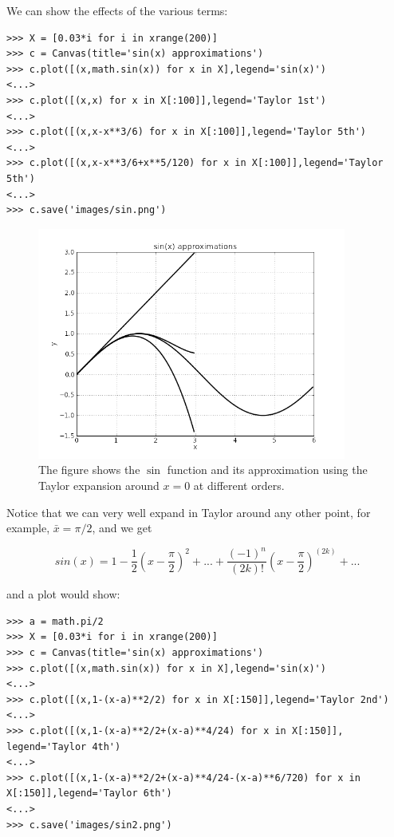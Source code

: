 \documentclass[justified,sixbynine]{tufte-book}
\def\ft{\small\tt}
\theoremstyle{plain}%
\theoremstyle{definition}
\theoremstyle{remark}
\begin{document}
\begin{fullwidth}
We can show the effects of the various terms:

\begin{lstlisting}[caption={in file: {\ft nlib.py}}]
>>> X = [0.03*i for i in xrange(200)]
>>> c = Canvas(title='sin(x) approximations')
>>> c.plot([(x,math.sin(x)) for x in X],legend='sin(x)')
<...>
>>> c.plot([(x,x) for x in X[:100]],legend='Taylor 1st')
<...>
>>> c.plot([(x,x-x**3/6) for x in X[:100]],legend='Taylor 5th')
<...>
>>> c.plot([(x,x-x**3/6+x**5/120) for x in X[:100]],legend='Taylor 5th')
<...>
>>> c.save('images/sin.png')
\end{lstlisting}

\begin{figure}[ht]
\centering\includegraphics[width=4in]{images/sin.png}
\caption{The figure shows the $\sin$ function and its approximation using the Taylor expansion around $x=0$ at different orders.}
\end{figure}

Notice that we can very well expand in Taylor around any other point, for example, $\bar x = \pi/2$, and we get

\begin{equation}
sin(x) =  1 - \frac1{2}(x-\frac{\pi}{2})^2 + ... + \frac{(-1)^n}{(2k)!}(x-\frac{\pi}{2})^{(2k)} + ...
\end{equation}

and a plot would show:

\begin{lstlisting}[caption={in file: {\ft nlib.py}}]
>>> a = math.pi/2
>>> X = [0.03*i for i in xrange(200)]
>>> c = Canvas(title='sin(x) approximations')
>>> c.plot([(x,math.sin(x)) for x in X],legend='sin(x)')
<...>
>>> c.plot([(x,1-(x-a)**2/2) for x in X[:150]],legend='Taylor 2nd')
<...>
>>> c.plot([(x,1-(x-a)**2/2+(x-a)**4/24) for x in X[:150]], legend='Taylor 4th')
<...>
>>> c.plot([(x,1-(x-a)**2/2+(x-a)**4/24-(x-a)**6/720) for x in X[:150]],legend='Taylor 6th')
<...>
>>> c.save('images/sin2.png')
\end{lstlisting}


\end{fullwidth}
\end{document}
